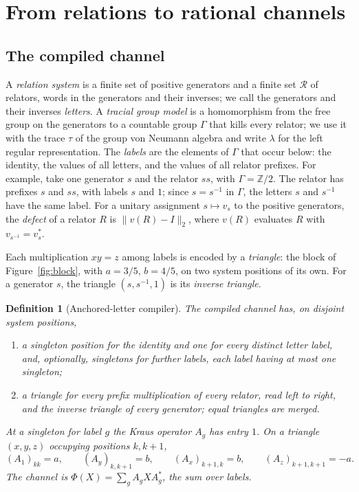\documentclass[11pt]{article}
\newtheorem{definition}[theorem]{Definition}
\begin{document}
\section{From relations to rational channels}\label{sec:compiler}

\subsection{The compiled channel}
A \emph{relation system} is a finite set of positive generators and a finite set $\mathcal R$ of relators, words in the generators and their inverses; we call the generators and their inverses \emph{letters}.  A \emph{tracial group model} is a homomorphism from the free group on the generators to a countable group $\Gamma$ that kills every relator; we use it with the trace $\tau$ of the group von Neumann algebra and write $\lambda$ for the left regular representation.  The \emph{labels} are the elements of $\Gamma$ that occur below: the identity, the values of all letters, and the values of all relator prefixes.  For example, take one generator $s$ and the relator $ss$, with $\Gamma=\mathbb Z/2$.  The relator has prefixes $s$ and $ss$, with labels $s$ and $1$; since $s=s^{-1}$ in $\Gamma$, the letters $s$ and $s^{-1}$ have the same label.  For a unitary assignment $s\mapsto v_s$ to the positive generators, the \emph{defect} of a relator $R$ is $\|v(R)-I\|_2$, where $v(R)$ evaluates $R$ with $v_{s^{-1}}=v_s^*$.

Each multiplication $xy=z$ among labels is encoded by a \emph{triangle}: the block of Figure~\ref{fig:block}, with $a=3/5$, $b=4/5$, on two system positions of its own.  For a generator $s$, the triangle $(s,s^{-1},1)$ is its \emph{inverse triangle}.

\begin{definition}[Anchored-letter compiler]\label{def:compiler}
The compiled channel has, on disjoint system positions,
\begin{enumerate}[label=(\roman*)]
\item a singleton position for the identity and one for every distinct letter label, and, optionally, singletons for further labels, each label having at most one singleton;
\item a triangle for every prefix multiplication of every relator, read left to right, and the inverse triangle of every generator; equal triangles are merged.
\end{enumerate}
At a singleton for label $g$ the Kraus operator $A_g$ has entry $1$.  On a triangle $(x,y,z)$ occupying positions $k,k+1$,
\[
 (A_1)_{kk}=a,\qquad (A_y)_{k,k+1}=b,\qquad (A_x)_{k+1,k}=b,\qquad (A_z)_{k+1,k+1}=-a.
\]
The channel is $\Phi(X)=\sum_gA_gXA_g^*$, the sum over labels.
\end{definition}
\end{document}
